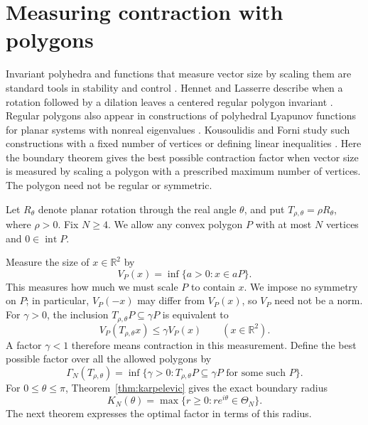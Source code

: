 \documentclass[11pt,a4paper]{article}
\theoremstyle{definition}
\theoremstyle{remark}
\numberwithin{equation}{section}
\begin{document}

\section{Measuring contraction with polygons}
\label{sec:gauges}

Invariant polyhedra and functions that measure vector size by scaling them are standard tools in stability and control \cite{Bitsoris,FarinaBenvenuti,Blanchini}. Hennet and Lasserre describe when a rotation followed by a dilation leaves a centered regular polygon invariant \cite[Lemma~2]{HennetLasserre}. Regular polygons also appear in constructions of polyhedral Lyapunov functions for planar systems with nonreal eigenvalues \cite{RossiColaneriShorten}. Kousoulidis and Forni study such constructions with a fixed number of vertices or defining linear inequalities \cite{KousoulidisForni}. Here the boundary theorem gives the best possible contraction factor when vector size is measured by scaling a polygon with a prescribed maximum number of vertices. The polygon need not be regular or symmetric.

Let $R_\theta$ denote planar rotation through the real angle $\theta$, and put $T_{\rho,\theta}=\rho R_\theta$, where $\rho>0$. Fix $N\ge4$. We allow any convex polygon $P$ with at most $N$ vertices and $0\in\operatorname{int}P$.

Measure the size of $x\in\mathbb R^2$ by
\[
 V_P(x)=\inf\{a>0:x\in aP\}.
\]
This measures how much we must scale $P$ to contain $x$. We impose no symmetry on $P$; in particular, $V_P(-x)$ may differ from $V_P(x)$, so $V_P$ need not be a norm.
For $\gamma>0$, the inclusion $T_{\rho,\theta}P\subseteq\gamma P$ is equivalent to
\[
 V_P(T_{\rho,\theta}x)\le\gamma V_P(x)
 \qquad(x\in\mathbb R^2).
\]
A factor $\gamma<1$ therefore means contraction in this measurement. Define the best possible factor over all the allowed polygons by
\[
 \Gamma_N(T_{\rho,\theta})
 =\inf\{\gamma>0:T_{\rho,\theta}P\subseteq\gamma P
                 \text{ for some such }P\}.
\]
For $0\le\theta\le\pi$, Theorem~\ref{thm:karpelevic} gives the exact boundary radius
\[
 K_N(\theta)=\max\{r\ge0:re^{i\theta}\in\Theta_N\}.
\]
The next theorem expresses the optimal factor in terms of this radius.
\end{document}
